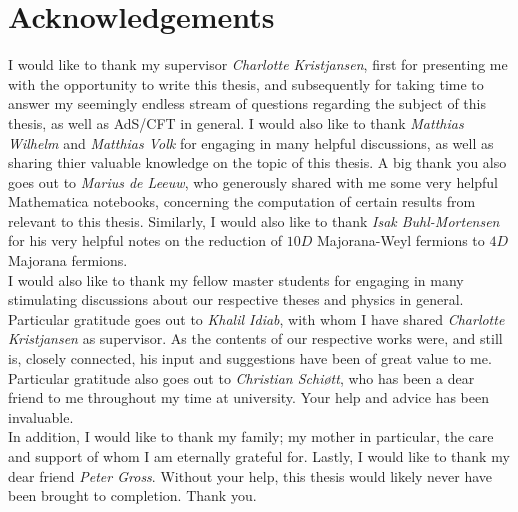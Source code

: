 
\newpage
\thispagestyle{empty}
%
%
\section*{Acknowledgements}
I would like to thank my supervisor \textit{Charlotte Kristjansen}, first for presenting me with the opportunity to write this thesis, and subsequently for taking time to answer my seemingly endless stream of questions regarding the subject of this thesis, as well as AdS/CFT in general. I would also like to thank \textit{Matthias Wilhelm} and \textit{Matthias Volk} for engaging in many helpful discussions, as well as sharing thier valuable knowledge on the topic of this thesis. A big thank you also goes out to \textit{Marius de Leeuw}, who generously shared with me some very helpful Mathematica notebooks, concerning the computation of certain results from \cite{Two-point functions in D5-D3} relevant to this thesis. Similarly, I would also like to thank \textit{Isak Buhl-Mortensen} for his very helpful notes on the reduction of $10D$ Majorana-Weyl fermions to $4D$ Majorana fermions.\\
I would also like to thank my fellow master students for engaging in many stimulating discussions about our respective theses and physics in general. Particular gratitude goes out to \textit{Khalil Idiab}, with whom I have shared \textit{Charlotte Kristjansen} as supervisor. As the contents of our respective works were, and still is, closely connected, his input and suggestions have been of great value to me. Particular gratitude also goes out to \textit{Christian Schi\o tt}, who has been a dear friend to me throughout my time at university. Your help and advice has been invaluable.\\
In addition, I would like to thank my family; my mother in particular, the care and support of whom I am eternally grateful for. Lastly, I would like to thank my dear friend \textit{Peter Gross}. Without your help, this thesis would likely never have been brought to completion. Thank you. 
%
%